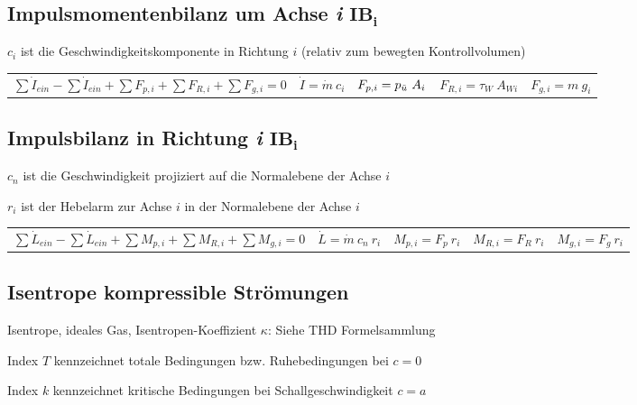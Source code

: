 \subsection{Impulsmomentenbilanz um Achse \textit{i} $\mathbf{IB_i}$ }
	$ c_i $ ist die Geschwindigkeitskomponente in Richtung $ i $ (relativ zum bewegten Kontrollvolumen)
%
	\begin{center}
		\setlength{\tabcolsep}{0.65em} %
		\begin{tabular}{lllll}
			  $ \sum \dot{I}_{ein} - \sum \dot{I}_{ein} + \sum F_{p,i} + \sum F_{R,i} + \sum F_{g,i} = 0$
			& $ \dot{I} = \dot{m} \ c_i $
			& $ F_{p,i} = p_{\ddot{u}} \ A_i $
			& $ F_{R,i} = \tau_W \ A_{Wi} $
			& $ F_{g,i} = m \ g_i $
		\end{tabular}
	\end{center}

\subsection{Impulsbilanz in Richtung \textit{i} $\mathbf{IB_i}$ }
	$ c_n $ ist die Geschwindigkeit projiziert auf die Normalebene der Achse $ i $

	$ r_i $ ist der Hebelarm zur Achse $ i $ in der Normalebene der Achse $ i $
%
	\begin{center}
		\setlength{\tabcolsep}{0.4em} %
		\begin{tabular}{lllll}
			$ \sum \dot{L}_{ein} - \sum \dot{L}_{ein} + \sum M_{p,i} + \sum M_{R,i} + \sum M_{g,i} = 0$
			& $ \dot{L} = \dot{m} \ c_n \ r_i $
			& $ M_{p,i} = F_p\ r_i $
			& $ M_{R,i} = F_R\ r_i $
			& $ M_{g,i} = F_g\ r_i $
		\end{tabular}
	\end{center}

\subsection{Isentrope kompressible Strömungen}
	Isentrope, ideales Gas, Isentropen-Koeffizient $\kappa$: Siehe THD Formelsammlung

	Index $ T $ kennzeichnet totale Bedingungen bzw. Ruhebedingungen bei $ c = 0 $

	Index $ k $ kennzeichnet kritische Bedingungen bei Schallgeschwindigkeit $ c = a $

